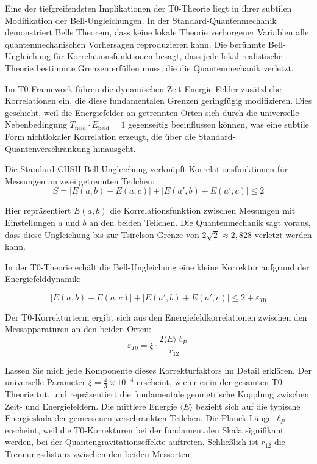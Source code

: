 \documentclass[12pt,a4paper]{article}
\newcommand{\xipar}{\xi}
\theoremstyle{definition}
\theoremstyle{remark}
\begin{document}
Eine der tiefgreifendsten Implikationen der T0-Theorie liegt in ihrer subtilen Modifikation der Bell-Ungleichungen. In der Standard-Quantenmechanik demonstriert Bells Theorem, dass keine lokale Theorie verborgener Variablen alle quantenmechanischen Vorhersagen reproduzieren kann. Die ber{\"u}hmte Bell-Ungleichung f{\"u}r Korrelationsfunktionen besagt, dass jede lokal realistische Theorie bestimmte Grenzen erf{\"u}llen muss, die die Quantenmechanik verletzt.

Im T0-Framework f{\"u}hren die dynamischen Zeit-Energie-Felder zus{\"a}tzliche Korrelationen ein, die diese fundamentalen Grenzen geringf{\"u}gig modifizieren. Dies geschieht, weil die Energiefelder an getrennten Orten sich durch die universelle Nebenbedingung $T_{\text{field}} \cdot E_{\text{field}} = 1$ gegenseitig beeinflussen k{\"o}nnen, was eine subtile Form nichtlokaler Korrelation erzeugt, die {\"u}ber die Standard-Quantenverschr{\"a}nkung hinausgeht.

Die Standard-CHSH-Bell-Ungleichung verkn{\"u}pft Korrelationsfunktionen f{\"u}r Messungen an zwei getrennten Teilchen:
\begin{equation}
	S = |E(a,b) - E(a,c)| + |E(a',b) + E(a',c)| \leq 2
	\label{eq:standard_bell}
\end{equation}

Hier repr{\"a}sentiert $E(a,b)$ die Korrelationsfunktion zwischen Messungen mit Einstellungen $a$ und $b$ an den beiden Teilchen. Die Quantenmechanik sagt voraus, dass diese Ungleichung bis zur Tsirelson-Grenze von $2\sqrt{2} \approx 2{,}828$ verletzt werden kann.

In der T0-Theorie erh{\"a}lt die Bell-Ungleichung eine kleine Korrektur aufgrund der Energiefelddynamik:

\begin{equation}
	\boxed{|E(a,b) - E(a,c)| + |E(a',b) + E(a',c)| \leq 2 + \varepsilon_{T0}}
	\label{eq:modified_bell}
\end{equation}

Der T0-Korrekturterm ergibt sich aus den Energiefeldkorrelationen zwischen den Messapparaturen an den beiden Orten:
\begin{equation}
	\varepsilon_{T0} = \xipar \cdot \frac{2\langle E \rangle \ell_P}{r_{12}}
	\label{eq:t0_bell_correction}
\end{equation}

Lassen Sie mich jede Komponente dieses Korrekturfaktors im Detail erkl{\"a}ren. Der universelle Parameter $\xipar = \frac{4}{3} \times 10^{-4}$ erscheint, wie er es in der gesamten T0-Theorie tut, und repr{\"a}sentiert die fundamentale geometrische Kopplung zwischen Zeit- und Energiefeldern. Die mittlere Energie $\langle E \rangle$ bezieht sich auf die typische Energieskala der gemessenen verschr{\"a}nkten Teilchen. Die Planck-L{\"a}nge $\ell_P$ erscheint, weil die T0-Korrekturen bei der fundamentalen Skala signifikant werden, bei der Quantengravitationseffekte auftreten. Schlie{\ss}lich ist $r_{12}$ die Trennungsdistanz zwischen den beiden Messorten.
\end{document}

